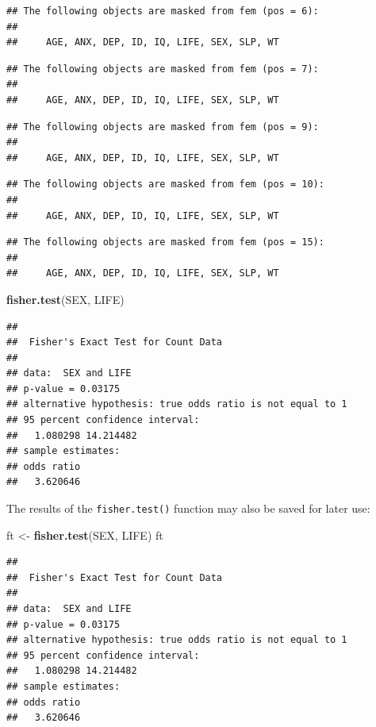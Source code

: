 \documentclass[12pt,a4paper]{book}
\newenvironment{Shaded}{\begin{snugshade}}{\end{snugshade}}
\newcommand{\KeywordTok}[1]{\textcolor[rgb]{0.13,0.29,0.53}{\textbf{#1}}}
\newcommand{\StringTok}[1]{\textcolor[rgb]{0.31,0.60,0.02}{#1}}
\newcommand{\NormalTok}[1]{#1}
\theoremstyle{definition}
\theoremstyle{definition}
\theoremstyle{definition}
\theoremstyle{remark}
\begin{document}
\begin{verbatim}
## The following objects are masked from fem (pos = 6):
## 
##     AGE, ANX, DEP, ID, IQ, LIFE, SEX, SLP, WT
\end{verbatim}

\begin{verbatim}
## The following objects are masked from fem (pos = 7):
## 
##     AGE, ANX, DEP, ID, IQ, LIFE, SEX, SLP, WT
\end{verbatim}

\begin{verbatim}
## The following objects are masked from fem (pos = 9):
## 
##     AGE, ANX, DEP, ID, IQ, LIFE, SEX, SLP, WT
\end{verbatim}

\begin{verbatim}
## The following objects are masked from fem (pos = 10):
## 
##     AGE, ANX, DEP, ID, IQ, LIFE, SEX, SLP, WT
\end{verbatim}

\begin{verbatim}
## The following objects are masked from fem (pos = 15):
## 
##     AGE, ANX, DEP, ID, IQ, LIFE, SEX, SLP, WT
\end{verbatim}

\begin{Shaded}
\begin{Highlighting}[]
\KeywordTok{fisher.test}\NormalTok{(SEX, LIFE)}
\end{Highlighting}
\end{Shaded}

\begin{verbatim}
## 
##  Fisher's Exact Test for Count Data
## 
## data:  SEX and LIFE
## p-value = 0.03175
## alternative hypothesis: true odds ratio is not equal to 1
## 95 percent confidence interval:
##   1.080298 14.214482
## sample estimates:
## odds ratio 
##   3.620646
\end{verbatim}

The results of the \texttt{fisher.test()} function may also be saved for
later use:

\begin{Shaded}
\begin{Highlighting}[]
\NormalTok{ft <-}\StringTok{ }\KeywordTok{fisher.test}\NormalTok{(SEX, LIFE)}
\NormalTok{ft}
\end{Highlighting}
\end{Shaded}

\begin{verbatim}
## 
##  Fisher's Exact Test for Count Data
## 
## data:  SEX and LIFE
## p-value = 0.03175
## alternative hypothesis: true odds ratio is not equal to 1
## 95 percent confidence interval:
##   1.080298 14.214482
## sample estimates:
## odds ratio 
##   3.620646
\end{verbatim}
\end{document}
